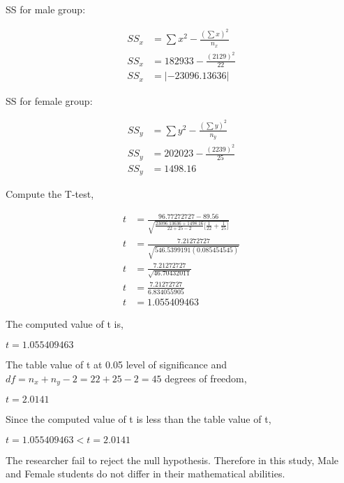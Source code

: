 \documentclass{article}
\begin{document}
    \clearpage
    \noindent
    SS for male group:
    \begin{center}
        \begin{align*}
            SS_x&=\sum x^2 - \frac{(\sum x)^2}{n_x}\\
            SS_x&=182933 - \frac{(2129)^2}{22}\\
            SS_x&=|-23096.13636|
        \end{align*}
    \end{center}
    SS for female group:
    \begin{center}
        \begin{align*}
            SS_y&=\sum y^2 - \frac{(\sum y)^2}{n_y}\\
            SS_y&=202023 - \frac{(2239)^2}{25}\\
            SS_y&=1498.16
        \end{align*}
    \end{center}
    Compute the T-test,
    \begin{center}
        \begin{align*}
            t&=\frac{96.77272727-89.56}{\sqrt{\frac{23096.13636+1498.16}{22+25-2}\bigl[\frac{1}{22}+\frac{1}{25}\bigr]}}\\
            t&=\frac{7.21272727}{\sqrt{546.5399191(0.085454545)}}\\
            t&=\frac{7.21272727}{\sqrt{46.70432011}}\\
            t&=\frac{7.21272727}{6.834055905}\\
            t&=1.055409463
        \end{align*}
    \end{center}
    The computed value of t is,
    \begin{center}
        $t=1.055409463$
    \end{center}
    The table value of t at 0.05 level of significance and $df=n_x+n_y-2=22+25-2=45$ degrees of freedom,
    \begin{center}
        $t=2.0141$
    \end{center}
    Since the computed value of t is less than the table value of t,
    \begin{center}
        $t=1.055409463<t=2.0141$
    \end{center}
    The researcher fail to reject the null hypothesis. Therefore in this study, Male and Female students do not differ in their mathematical abilities.

    \newpage
\end{document}
